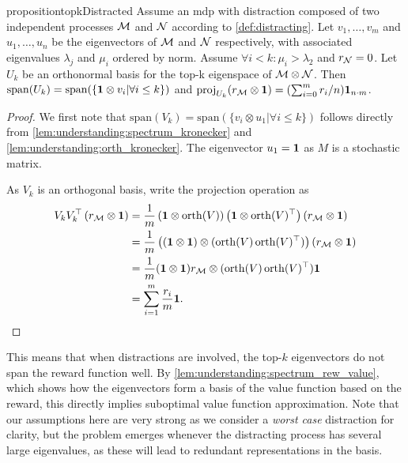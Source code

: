 \begin{restatable}{proposition}{topkDistracted} \label{prop:SubptimalTopKProduct} Assume an \ac{mdp}  with distraction composed of two independent processes ${\mathcal{M}}$ and ${\mathcal{N}}$ according to \cref{def:distracting}.
Let $v_1,\dots,v_m$ and $u_1,\dots,u_n$ be the eigenvectors of ${\mathcal{M}}$ and ${\mathcal{N}}$ respectively, with associated eigenvalues $\lambda_j$ and $\mu_i$ ordered by norm.
Assume $\forall i < k: \mu_i > \lambda_2$ and $r_{\mathcal{N}} = 0$.
Let $U_k$ be an orthonormal basis for the top-k eigenspace of ${\mathcal{M}} \otimes {\mathcal{N}}$.
Then $\mathrm{span}(U_k) = \mathrm{span}(\{{\bm{1}} \otimes v_i|\forall i \leq k\})$ and $\mathrm{proj}_{U_k}(r_{\mathcal{M}} \otimes {\bm{1}}) = (\sum_{i=0}^m r_i / n) {\bm{1}}_{n\cdot m}$.
\end{restatable}
\begin{proof}
We first note that $\mathrm{span}(V_k) = \mathrm{span}(\{v_i\otimes u_1|\forall i \leq k\})$ follows directly from \autoref{lem:understanding:spectrum_kronecker} and \autoref{lem:understanding:orth_kronecker}. The eigenvector $u_1 = {\bm{1}}$ as $M$ is a stochastic matrix.

As $V_k$ is an orthogonal basis, write the projection operation as 
\begin{align}
V_k V_k^\top \left(r_{\mathcal{M}} \otimes {\bm{1}}\right) &= \frac{1}{m}\left({\bm{1}} \otimes \mathrm{orth}(V)\right)\left({\bm{1}} \otimes \mathrm{orth}(V)^\top \right)\left(r_{\mathcal{M}} \otimes {\bm{1}}\right) \\
&= \frac{1}{m}\left(({\bm{1}} \otimes {\bm{1}}) \otimes (\mathrm{orth}(V)\,\mathrm{orth}(V)^\top)\right) (r_{\mathcal{M}} \otimes {\bm{1}})\\
&= \frac{1}{m}({\bm{1}} \otimes {\bm{1}}) r_{\mathcal{M}} \otimes (\mathrm{orth}(V)\,\mathrm{orth}(V)^\top) {\bm{1}} \\
&= \sum_{i=1}^m \frac{r_i}{m}{\bm{1}}.
\end{align}
\end{proof}

This means that when distractions are involved, the top-$k$ eigenvectors do not span the reward function well.
By \autoref{lem:understanding:spectrum_rew_value}, which shows how the eigenvectors form a basis of the value function based on the reward, this directly implies suboptimal value function approximation.
Note that our assumptions here are very strong as we consider a \emph{worst case} distraction for clarity, but the problem emerges whenever the distracting process has several large eigenvalues, as these will lead to redundant representations in the basis.

